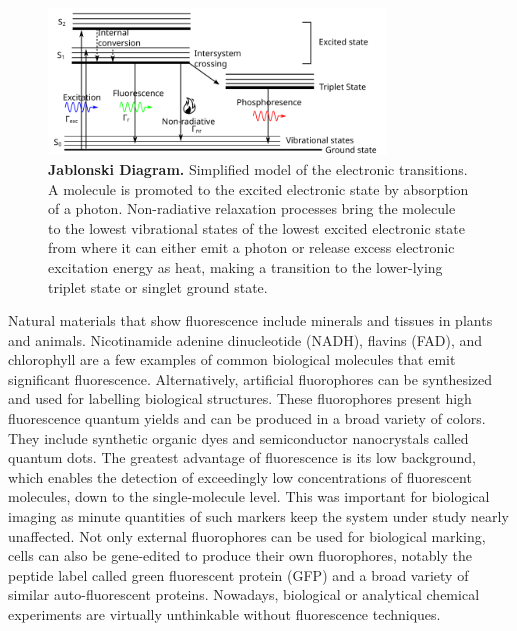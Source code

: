 \begin{figure}
	\centering
	\includegraphics[width=0.8\textwidth]{jablonski}
	\caption{\textbf{Jablonski Diagram.} Simplified model of the electronic transitions. A molecule is promoted to the excited electronic state by absorption of a photon. Non-radiative relaxation processes bring the molecule to the lowest vibrational states of the lowest excited electronic state from where it can either emit a photon or release excess electronic excitation energy as heat, making a transition to the lower-lying triplet state or singlet ground state.}
	\label{fig:jablonski}
\end{figure}

Natural materials that show fluorescence include minerals and tissues in plants and animals.
Nicotinamide adenine dinucleotide (NADH), flavins (FAD), and chlorophyll are a few examples of common biological molecules that emit significant fluorescence.\cite{blacker2014separating,siano1989nadh,genty1989the}
Alternatively, artificial fluorophores can be synthesized and used for labelling biological structures. These fluorophores present high fluorescence quantum yields and can be produced in a broad variety of colors. They include synthetic organic dyes and semiconductor nanocrystals called quantum dots.\cite{atkinson1952the,alivisatos1996semiconductor}
The greatest advantage of fluorescence is its low background, which enables the detection of exceedingly low concentrations of fluorescent molecules, down to the single-molecule level.
This was important for biological imaging as minute quantities of such markers keep the system under study nearly unaffected.\cite{white1987an}
Not only external fluorophores can be used for biological marking, cells can also be gene-edited to produce their own fluorophores, notably the peptide label called green fluorescent protein (GFP) and a broad variety of similar auto-fluorescent proteins.\cite{tsien1998the,chalfie1994green}
Nowadays, biological or analytical chemical experiments are virtually unthinkable without fluorescence techniques.

